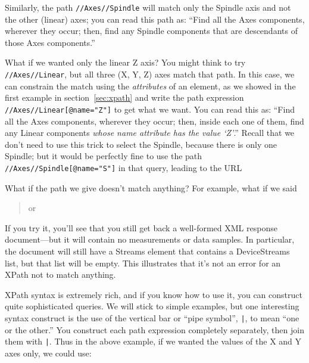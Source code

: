 Similarly, the path \texttt{//Axes//Spindle} will match only the Spindle
axis and not the other (linear) axes; you can read this path as: ``Find
all the Axes components, wherever they occur; then, find any Spindle
components that are descendants of those Axes components.''

What if we wanted only the linear Z axis?  You might think to try
\texttt{//Axes//Linear}, but all three (X, Y, Z) axes  match that path.
In this case, we  can
constrain the match using the \emph{attributes} of an element, as we
showed in the first example in section~\ref{sec:xpath} 
and write the path expression \texttt{//Axes//Linear[@name="Z"]} to get
what we want.  You can read this as:  ``Find
all the Axes components, wherever they occur; then, inside each one of
them, find any Linear components \emph{whose \emph{name} attribute has
  the value `Z'}.''  Recall that we don't need to use this trick to select the
Spindle, because there is only one Spindle; but it would be
perfectly fine to use the path \texttt{//Axes//Spindle[@name="S"]} in
that query, leading to the URL

\begin{quotation}
\end{quotation}

What if the path we give doesn't match anything?  For example, what if
we said

\begin{quotation}
   or \\
\end{quotation}

If you try it, you'll see
that you still get back a well-formed XML response document---but it
will contain no measurements or data samples.  In particular, the
document will still have a Streams element that contains a DeviceStreams
list, but that list will be empty.  This illustrates that it's not an
error for an XPath not to match anything.


XPath syntax is extremely rich, and if you know how to use it, you can
construct quite sophisticated queries.  We will stick to 
simple examples, but one interesting syntax construct is the use of
the vertical bar or ``pipe symbol'',  \verb+|+, to mean ``one or the
other.''  You construct each path expression completely separately, then
join them with \verb+|+.  Thus in the above example, if we wanted the
values of the X and Y axes only, we could use:

